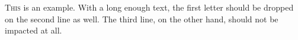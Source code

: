 \documentclass{report}
\begin{document}
    \lettrine[lraise=0.1, nindent=0em, slope=-.5em]{T}{his} is an example.
    With a long enough text, the first letter should be dropped on the second
    line as well.
    The third line, on the other hand, should not be impacted at all.
\end{document}
